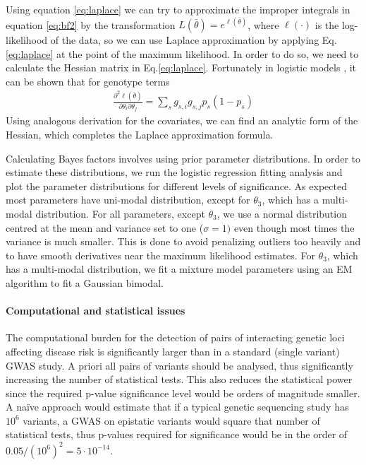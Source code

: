Using equation \ref{eq:laplace} we can try to approximate the improper integrals in equation \ref{eq:bf2} by the transformation $L(\bar{\theta}) = e^{\ell(\bar{\theta})}$, where $\ell(\cdot)$ is the log-likelihood of the data, so we can use Laplace approximation by applying Eq.\ref{eq:laplace} at the point of the maximum likelihood.
In order to do so, we need to calculate the Hessian matrix in Eq.\ref{eq:laplace}.
Fortunately in logistic models 
, it can be shown that for genotype terms
\begin{eqnarray*}
	\frac{ \partial^2 \ell(\bar{\theta}) }{ \partial\theta_i \partial\theta_j } 
	= \sum_s{ g_{s,i} g_{s,j} p_s (1-p_s) } 
\end{eqnarray*}
\noindent Using analogous derivation for the covariates, we can find an analytic form of the Hessian, which completes the Laplace approximation formula.

Calculating Bayes factors involves using prior parameter distributions. 
In order to estimate these distributions, we run the logistic regression fitting analysis and plot the parameter distributions for different levels of significance. 
As expected most parameters have uni-modal distribution, except for $\theta_3$, which has a multi-modal distribution. 
For all parameters, except $\theta_3$, we use a normal distribution centred at the mean and variance set to one ($\sigma=1)$ even though most times the variance is much smaller. 
This is done to avoid penalizing outliers too heavily and to have smooth derivatives near the maximum likelihood estimates. 
For $\theta_3$, which has a multi-modal distribution, we fit a mixture model parameters using an EM algorithm to fit a Gaussian bimodal.

\paragraph{Computational and statistical issues} 
The computational burden for the detection of pairs of interacting genetic loci affecting disease risk is significantly larger than in a standard (single variant) GWAS study. 
A priori all pairs of variants should be analysed, thus significantly increasing the number of statistical tests. 
This also reduces the statistical power since the required p-value significance level would be orders of magnitude smaller. 
A na{\"i}ve approach would estimate that if a typical genetic sequencing study has $10^6$ variants, a GWAS on epistatic variants would square that number of statistical tests, thus p-values required for significance would be in the order of $0.05 / (10^6)^2 = 5 \cdot 10^{-14}$. 

